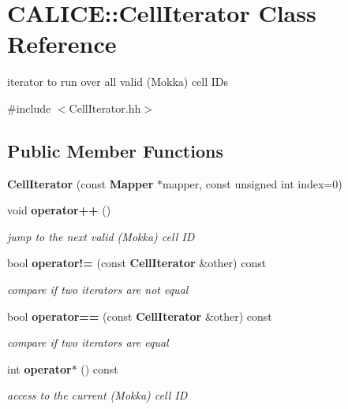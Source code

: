 \section{CALICE::CellIterator Class Reference}
\label{classCALICE_1_1CellIterator}


iterator to run over all valid (Mokka) cell IDs  


{\ttfamily \#include $<$CellIterator.hh$>$}\subsection*{Public Member Functions}
\begin{DoxyCompactItemize}
\item 
{\bfseries CellIterator} (const {\bf Mapper} $\ast$mapper, const unsigned int index=0)\label{classCALICE_1_1CellIterator_a55f049561c6efd49d8ac05d8fd1892d9}

\item 
void {\bf operator++} ()\label{classCALICE_1_1CellIterator_aa8632dfb854dab0d3afa78eee2d3e4fe}

\begin{DoxyCompactList}\small\item\em jump to the next valid (Mokka) cell ID \item\end{DoxyCompactList}\item 
bool {\bf operator!=} (const {\bf CellIterator} \&other) const \label{classCALICE_1_1CellIterator_afad05336400eeb213d96a7bb837e47da}

\begin{DoxyCompactList}\small\item\em compare if two iterators are not equal \item\end{DoxyCompactList}\item 
bool {\bf operator==} (const {\bf CellIterator} \&other) const \label{classCALICE_1_1CellIterator_a16d97b72ac170520e4ddbcb54ae2b7ae}

\begin{DoxyCompactList}\small\item\em compare if two iterators are equal \item\end{DoxyCompactList}\item 
int {\bf operator$\ast$} () const 
\begin{DoxyCompactList}\small\item\em access to the current (Mokka) cell ID \item\end{DoxyCompactList}\end{DoxyCompactItemize}
